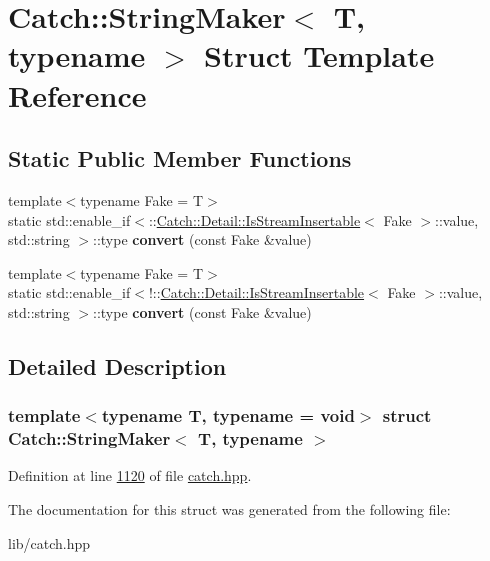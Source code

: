 \hypertarget{structCatch_1_1StringMaker}{}\section{Catch\+::String\+Maker$<$ T, typename $>$ Struct Template Reference}
\label{structCatch_1_1StringMaker}
\subsection*{Static Public Member Functions}
\begin{DoxyCompactItemize}
\item 
\mbox{\label{structCatch_1_1StringMaker_ab2c357e22b754802c4b1351257103eb6}} 
{\footnotesize template$<$typename Fake  = T$>$ }\\static std\+::enable\+\_\+if$<$\+::\mbox{\hyperlink{classCatch_1_1Detail_1_1IsStreamInsertable}{Catch\+::\+Detail\+::\+Is\+Stream\+Insertable}}$<$ Fake $>$\+::value, std\+::string $>$\+::type {\bfseries convert} (const Fake \&value)
\item 
\mbox{\label{structCatch_1_1StringMaker_a68bb548de0e5ad364228b1ca3dd2f561}} 
{\footnotesize template$<$typename Fake  = T$>$ }\\static std\+::enable\+\_\+if$<$!\+::\mbox{\hyperlink{classCatch_1_1Detail_1_1IsStreamInsertable}{Catch\+::\+Detail\+::\+Is\+Stream\+Insertable}}$<$ Fake $>$\+::value, std\+::string $>$\+::type {\bfseries convert} (const Fake \&value)
\end{DoxyCompactItemize}


\subsection{Detailed Description}
\subsubsection*{template$<$typename T, typename = void$>$\newline
struct Catch\+::\+String\+Maker$<$ T, typename $>$}



Definition at line \mbox{\hyperlink{catch_8hpp_source_l01120}{1120}} of file \mbox{\hyperlink{catch_8hpp_source}{catch.\+hpp}}.



The documentation for this struct was generated from the following file\+:\begin{DoxyCompactItemize}
\item 
lib/catch.\+hpp\end{DoxyCompactItemize}

